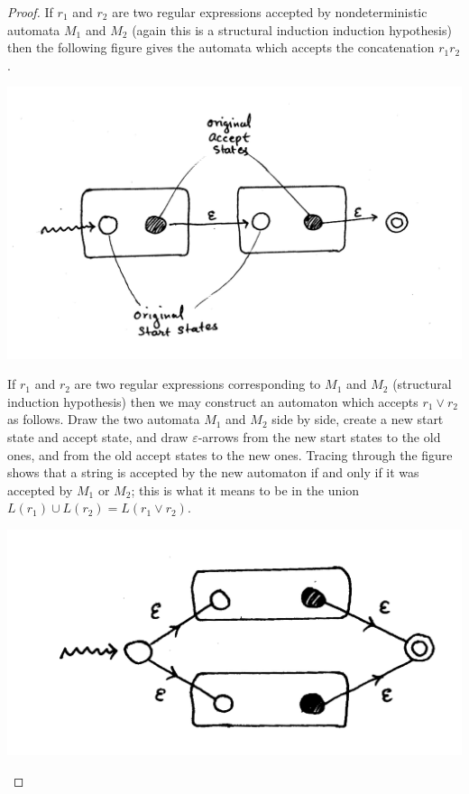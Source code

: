 \begin{proof}
    If $r_1$ and $r_2$ are two regular expressions accepted by
    nondeterministic automata $M_1$ and $M_2$ (again this is a
    structural induction induction hypothesis) then the following
    figure gives the automata which accepts the concatenation $r_1
    r_2$.

    \begin{center}
        \includegraphics[scale=0.2]{resources/1-8.pdf}
    \end{center}

    If $r_1$ and $r_2$ are two regular expressions corresponding to
    $M_1$ and $M_2$ (structural induction hypothesis) then we may
    construct an automaton which accepts $r_1 \vee r_2$ as follows.
    Draw the two automata $M_1$ and $M_2$ side by side, create a new
    start state and accept state, and draw $\varepsilon$-arrows from
    the new start states to the old ones, and from the old accept
    states to the new ones. Tracing through the figure shows that a
    string is accepted by the new automaton if and only if it was
    accepted by $M_1$ or $M_2$; this is what it means to be in the
    union $L(r_1) \cup L(r_2) = L(r_1\vee r_2)$.

    \begin{center}
        \includegraphics[scale=0.2]{resources/1-9.pdf}
    \end{center}


\end{proof}
